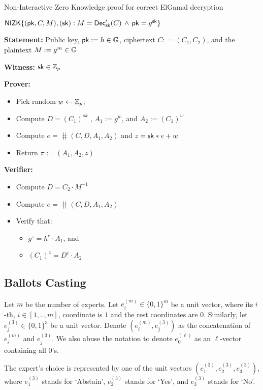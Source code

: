 \begin{boxfig}{\label{fig:ElgamalDecrNIZK}Non-Interactive Zero Knowledge proof for correct ElGamal decryption}{}
\begin{center}
$\mathsf{NIZK}\{(\mathsf{pk}, C, M ),(\mathsf{sk}): M = \mathsf{Dec}'_{\mathsf{sk}}(C) \, \wedge \, \mathsf{pk} = g^{\mathsf{sk}}\}$
\end{center}

\textbf{Statement:} Public key, $\mathsf{pk}:=h \in\mathbb{G}$,  ciphertext $C: =(C_1, C_2 )$, and the plaintext $M:=g^m \in\mathbb{G}$

\textbf{Witness:} $\mathsf{sk}\in\mathbb{Z}_p$

\medskip
\textbf{Prover:}
\begin{itemize}
\item Pick random $w \leftarrow  {\mathbb{Z}_p}$; 
\item Compute $D=(C_1)^{sk}$ , $A_1 := g^w$, and $A_2 := (C_1)^w $
\item Compute $e = \hash(C,D,A_1,A_2)$ and  $ z = \mathsf{sk}*e + w$
\item Return $\pi:=(A_1,A_2,z)$
\end{itemize}

\textbf{Verifier:}
\begin{itemize}
\item Compute $D=C_2 \cdot M^{-1}$
\item Compute $e = \hash(C,D,A_1,A_2)$
\item Verify that:
    \begin{itemize}
    \item $g^z = h^e \cdot A_1$, and
    \item $(C_1)^{z} = D^e \cdot A_2$ 
    \end{itemize}
\end{itemize}
\end{boxfig}

\FloatBarrier
\subsection{Ballots Casting}

Let $m$ be the number of experts. Let $e^{(m)}_i \in \{0,1\}^{m}$ be a unit vector, where its $i$-th, $i \in [1,..,m]$, coordinate is $1$ and the rest coordinates are $0$. Similarly, let  $e^{(3)}_j \in \{0,1\}^{3}$ be a unit vector. Denote $( e^{(m)}_i , e^{(3)}_j )$ as the concatenation of $e^{(m)}_i $ and $e^{(3)}_j$.  We also abuse the notation to denote  $e^{(\ell)}_0$ as an $\ell$-vector containing all $0$'s.  

The expert's choice  is represented by one of the unit vectors $(e^{(3)}_1, e^{(3)}_2, e^{(3)}_3)$, where $e^{(3)}_1$ stands for `Abstain', $e^{(3)}_2$ stands for `Yes', and $e^{(3)}_3$ stands for `No'.

